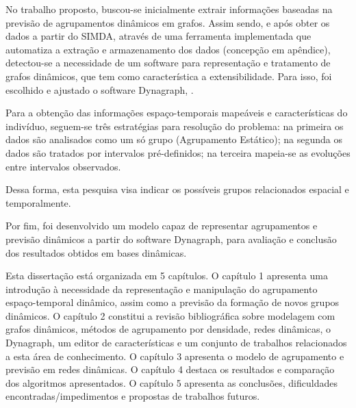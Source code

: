 No trabalho proposto, buscou-se inicialmente extrair informações baseadas na previsão de agrupamentos dinâmicos em grafos. Assim sendo, e após obter os dados a partir do \acrshort{SIMDA}, através de uma ferramenta implementada que automatiza a extração e armazenamento dos dados (concepção em apêndice), detectou-se a necessidade de um software para representação e tratamento de grafos dinâmicos, que tem como característica a extensibilidade. Para isso, foi escolhido e ajustado o software Dynagraph, \cite{dynagraph}.

Para a obtenção das informações espaço-temporais mapeáveis e características do indivíduo, seguem-se três estratégias para resolução do problema: na primeira os dados são analisados como um só grupo (Agrupamento Estático); na segunda os dados são tratados por intervalos pré-definidos; na terceira mapeia-se as evoluções entre intervalos observados.

Dessa forma, esta pesquisa visa indicar os possíveis grupos relacionados espacial e temporalmente.

Por fim, foi desenvolvido um modelo capaz de representar agrupamentos e previsão dinâmicos a partir do software Dynagraph, para avaliação e conclusão dos resultados obtidos em bases dinâmicas.


Esta dissertação está organizada em 5 capítulos. O capítulo 1 apresenta uma
introdução à necessidade da representação e manipulação do agrupamento espaço-temporal dinâmico, assim como a previsão da formação de novos grupos dinâmicos. O capítulo 2 constitui a revisão bibliográfica sobre modelagem com grafos dinâmicos, métodos de agrupamento por densidade, redes dinâmicas, o Dynagraph, um editor de características e um conjunto de trabalhos relacionados a esta área de conhecimento. O capítulo 3 apresenta o modelo de agrupamento e previsão em redes dinâmicas. O capítulo 4 destaca
os resultados e comparação dos algoritmos apresentados. O capítulo 5 apresenta as conclusões, dificuldades encontradas/impedimentos e propostas de trabalhos futuros.








